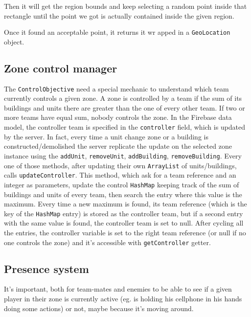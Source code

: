 			Then it will get the region bounds and keep selecting a random point inside that rectangle until the point we got is actually contained inside the given region.
			
			Once it found an acceptable point, it returns it wr
			apped in a \lstinline|GeoLocation| object.
		
		\subsection{Zone control manager}\label{focus:control}
		
			The \lstinline|ControlObjective| need a special mechanic to understand which team currently controls a given zone.
			A zone is controlled by a team if the sum of its buildings and units there are greater than the one of every other team.
			If two or more teams have equal sum, nobody controls the zone.
			In the Firebase data model, the controller team is specified in the \lstinline|controller| field, which is updated by the server.
			In fact, every time a unit change zone or a building is constructed/demolished the server replicate the update on the selected zone instance using the \lstinline|addUnit|, \lstinline|removeUnit|, \lstinline|addBuilding|, \lstinline|removeBuilding|.
			Every one of those methods, after updating their own \lstinline|ArrayList| of units/buildings, calls \lstinline|updateController|.
			This method, which ask for a team reference and an integer as parameters, update the control \lstinline|HashMap| keeping track of the sum of buildings and units of every team, then search the entry where this value is the maximum.
			Every time a new maximum is found, its team reference (which is the key of the \lstinline|HashMap| entry) is stored as the controller team, but if a second entry with the same value is found, the controller team is set to null.
			After cycling all the entries, the controller variable is set to the right team reference (or null if no one controls the zone) and it's accessible with \lstinline|getController| getter.
		
		\subsection{Presence system}\label{focus:presence}

			It's important, both for team-mates and enemies to be able to see if a given player in their zone is currently active (eg. is holding his cellphone in his hands doing some actions) or not, maybe because it's moving around.
			
